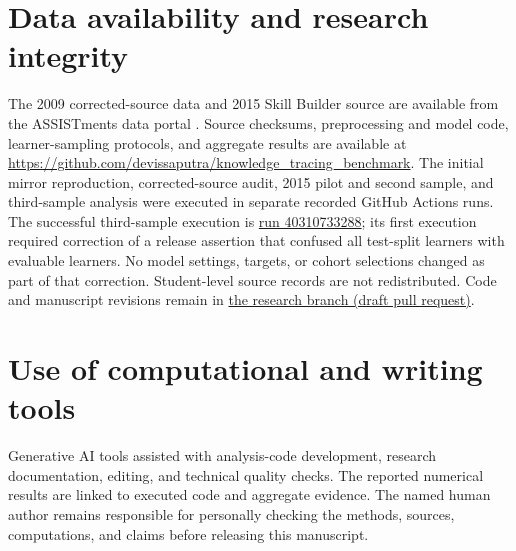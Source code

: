 \documentclass[11pt,a4paper]{article}
\begin{document}
\section*{Data availability and research integrity}
The 2009 corrected-source data and 2015 Skill Builder source are available from the ASSISTments data portal \citep{assistmentsdata,assistments2015}. Source checksums, preprocessing and model code, learner-sampling protocols, and aggregate results are available at \url{https://github.com/devissaputra/knowledge_tracing_benchmark}. The initial mirror reproduction, corrected-source audit, 2015 pilot and second sample, and third-sample analysis were executed in separate recorded GitHub Actions runs. The successful third-sample execution is \href{https://github.com/devissaputra/knowledge_tracing_benchmark/actions/runs/40310733288}{run 40310733288}; its first execution required correction of a release assertion that confused all test-split learners with evaluable learners. No model settings, targets, or cohort selections changed as part of that correction. Student-level source records are not redistributed. Code and manuscript revisions remain in \href{https://github.com/devissaputra/knowledge_tracing_benchmark/pull/3}{the research branch (draft pull request)}.

\section*{Use of computational and writing tools}
Generative AI tools assisted with analysis-code development, research documentation, editing, and technical quality checks. The reported numerical results are linked to executed code and aggregate evidence. The named human author remains responsible for personally checking the methods, sources, computations, and claims before releasing this manuscript.
\end{document}
